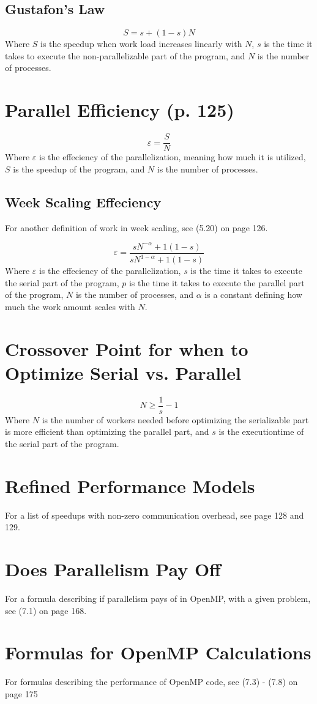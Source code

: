 \documentclass{article}
\begin{document}
		\subsection{Gustafon's Law}
			\begin{equation}
				S=s+(1-s)N
			\end{equation}
			Where $S$ is the speedup when work load increases linearly with $N$, $s$ is the time it takes to execute the non-parallelizable part of the program, and $N$ is the number of processes.
	
	\section{Parallel Efficiency (p. 125)}
		\begin{equation}
			\varepsilon=\frac{S}{N}
		\end{equation}
		Where $\varepsilon$ is the effeciency of the parallelization, meaning how much it is utilized, $S$ is the speedup of the program, and $N$ is the number of processes.

		\subsection{Week Scaling Effeciency}
			For another definition of work in week scaling, see (5.20) on page 126.

			\begin{equation}
				\varepsilon=\frac{sN^{-\alpha}+1(1-s)}{sN^{1-\alpha}+1(1-s)}
			\end{equation}
			Where $\varepsilon$ is the effeciency of the parallelization, $s$ is the time it takes to execute the serial part of the program, $p$ is the time it takes to execute the parallel part of the program, $N$ is the number of processes, and $\alpha$ is a constant defining how much the work amount scales with $N$.
	
	\section{Crossover Point for when to Optimize Serial vs. Parallel}
			\begin{equation}
				N\geq\frac{1}{s}-1
			\end{equation}
			Where $N$ is the number of workers needed before optimizing the serializable part is more efficient than optimizing the parallel part, and $s$ is the executiontime of the serial part of the program.
	
	\section{Refined Performance Models}
		For a list of speedups with non-zero communication overhead, see page 128 and 129.
	
	\section{Does Parallelism Pay Off}
		For a formula describing if parallelism pays of in OpenMP, with a given problem, see (7.1) on page 168.
	
	\section{Formulas for OpenMP Calculations}
		For formulas describing the performance of OpenMP code, see (7.3) - (7.8) on page 175
\end{document}
